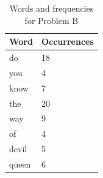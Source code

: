 \begin{table}[]
\centering
\caption{Words and frequencies for Problem B}
\begin{tabular}{|l|l|}
\hline
Word  & Occurrences \\ \hline
do    & 18          \\
you   & 4           \\
know  & 7           \\
the   & 20          \\
way   & 9          \\
of    & 4           \\
devil & 5           \\
queen & 6           \\ \hline
\end{tabular}
\end{table}

\newpage

